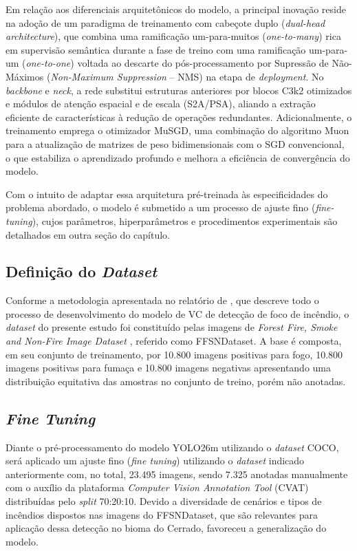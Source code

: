 Em relação aos diferenciais arquitetônicos do modelo, a principal inovação reside na adoção de um paradigma de treinamento com cabeçote duplo (\textit{dual-head architecture}), que combina uma
ramificação um-para-muitos (\textit{one-to-many}) rica em supervisão semântica durante a fase de treino com uma ramificação um-para-um (\textit{one-to-one}) voltada ao descarte do
pós-processamento por Supressão de Não-Máximos (\textit{Non-Maximum Suppression} -- NMS) na etapa de \textit{deployment}. No \textit{backbone} e \textit{neck}, a rede substitui estruturas
anteriores por blocos C3k2 otimizados e módulos de atenção espacial e de escala (S2A/PSA), aliando a extração eficiente de características à redução de operações redundantes. Adicionalmente, o treinamento emprega o otimizador MuSGD, uma combinação do algoritmo Muon para a atualização de matrizes de peso bidimensionais com o SGD convencional, o que estabiliza o aprendizado profundo e melhora a eficiência de convergência do modelo.

Com o intuito de adaptar essa arquitetura pré-treinada às especificidades do problema abordado, o modelo é submetido a um processo de ajuste fino (\textit{fine-tuning}), cujos parâmetros,
hiperparâmetros e procedimentos experimentais são detalhados em outra seção do capítulo.

\subsection{Definição do \textit{Dataset}}
\label{subsec:def_dataset}

Conforme a metodologia apresentada no relatório de , que descreve todo o processo de desenvolvimento do modelo de VC de detecção de foco de incêndio, o \textit{dataset}
do presente estudo foi constituído pelas imagens de \textit{Forest Fire, Smoke and Non-Fire Image Dataset} \cite{minha2023forest}, referido como FFSNDataset. A base é composta, em seu conjunto de
treinamento, por 10.800 imagens positivas para fogo, 10.800 imagens positivas para fumaça e 10.800 imagens negativas apresentando uma distribuição equitativa das amostras no conjunto de treino, porém não anotadas.

\subsection{\textit{Fine Tuning}}
\label{subsec:fine_tuning}

Diante o pré-processamento do modelo YOLO26m utilizando o \textit{dataset} COCO, será aplicado um ajuste fino (\textit{fine tuning}) utilizando o \textit{dataset} indicado anteriormente com, no
total, 23.495 imagens, sendo 7.325 anotadas manualmente com o auxílio da plataforma \textit{Computer Vision Annotation Tool} (CVAT) distribuídas pelo \textit{split} 70:20:10. Devido a diversidade de cenários e tipos de incêndios dispostos nas imagens do FFSNDataset, que são relevantes para aplicação dessa detecção no bioma do Cerrado, favoreceu a generalização do modelo.

